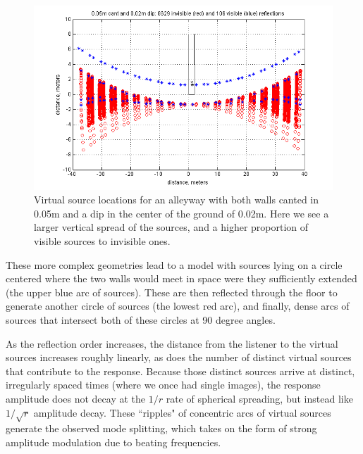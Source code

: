 \documentclass{aes137}
\begin{document}
\begin{figure}[h!] \centering \includegraphics[width=\linewidth, trim=13mm 2mm 10mm 3mm, clip]{images/ISM_0pt05m_cant_0pt02m_dip.png} 
\caption{Virtual source locations for an alleyway with both walls canted in 0.05m and a dip in the center of the ground of 0.02m. Here we see a larger vertical spread of the sources, and a higher proportion of visible sources to invisible ones.} 
\end{figure}

These more complex geometries lead to a model with sources lying on a
circle centered where the two walls would meet in space were they
sufficiently extended (the upper blue arc of sources). These are then reflected through the floor to generate another circle of sources (the lowest red arc), and finally, dense arcs of sources that intersect
both of these circles at 90 degree angles.

As the reflection order increases, the distance from the listener to the virtual sources increases roughly linearly, as does the number of distinct virtual sources that contribute to the response. Because those distinct sources arrive at distinct, irregularly spaced times (where we once had single images), the response amplitude does not decay at the $1/r$ rate of spherical spreading, but instead like $1/\sqrt{r}$ amplitude decay. %
These ``ripples" of concentric arcs of virtual sources generate the observed mode splitting, which takes on the form of strong amplitude modulation due to beating frequencies.


\end{document}
